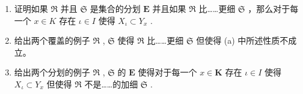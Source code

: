 \begin{enumerate}
\def\labelenumi{(\alph{enumi})}
\item
  证明如果 \(\mathfrak{R}\) 并且 \(\mathfrak{S}\) 是集合的分划 \(\mathbf{E}\) 并且如果 \(\mathfrak{R}\) 比……更细 \(\mathfrak{S}\) ，那么对于每一个 \(x \in K\) 存在 \(\iota \in I\) 使得 \(X_{\iota} \subset Y_{x}\) .
\item
  给出两个覆盖的例子 \(\mathfrak{R}\) , \(\mathfrak{S}\) 使得 \(\mathfrak{R}\) 比……更细 \(\mathfrak{S}\) 但使得 (a) 中所述性质不成立。
\item
  给出两个分划的例子 \(\mathfrak{R}\) , \(\mathfrak{S}\) 的 \(\mathbf{E}\) 使得对于每一个 \(x \in \mathbf{K}\) 存在 \(\iota \in I\) 使得 \(X_{\iota} \subset Y_{x}\) 但使得 \(\mathfrak{R}\) 不是……的加细 \(\mathfrak{S}\) .
\end{enumerate}

